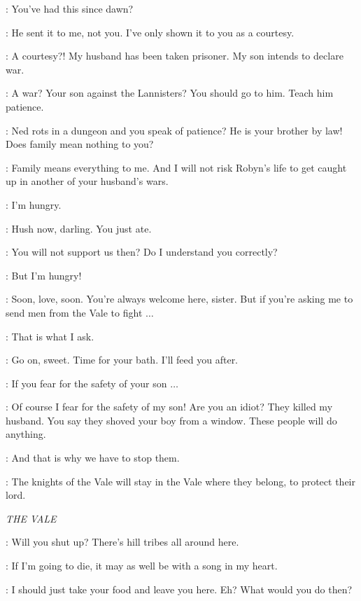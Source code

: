 \CATELYN: You've had this since dawn? 

\LYSA: He sent it to me, not you. I've only shown it to you as a courtesy. 

\CATELYN: A courtesy?! My husband has been taken prisoner. My son intends to declare war. 

\LYSA: A war? Your son against the Lannisters? You should go to him. Teach him patience. 

\CATELYN: Ned rots in a dungeon and you speak of patience? He is your brother by law! Does family mean nothing to you? 

\LYSA: Family means everything to me. And I will not risk Robyn's life to get caught up in another of your husband's wars. 

\ROBYN: I'm hungry. 

\LYSA: Hush now, darling. You just ate. 

\CATELYN: You will not support us then? Do I understand you correctly? 

\ROBYN: But I'm hungry! 

\LYSA: Soon, love, soon. You're always welcome here, sister. But if you're asking me to send men from the Vale to fight $\ldots$  

\CATELYN: That is what I ask. 

\LYSA: Go on, sweet. Time for your bath. I'll feed you after. 


\CATELYN: If you fear for the safety of your son $\ldots$  

\LYSA: Of course I fear for the safety of my son! Are you an idiot? They killed my husband. You say they shoved your boy from a window. These people will do anything. 

\CATELYN: And that is why we have to stop them. 

\LYSA: The knights of the Vale will stay in the Vale where they belong, to protect their lord. 


\scene

\textit{THE VALE} 


\BRONN: Will you shut up? There's hill tribes all around here. 

\TYRION: If I'm going to die, it may as well be with a song in my heart. 

\BRONN: I should just take your food and leave you here. Eh? What would you do then? 

